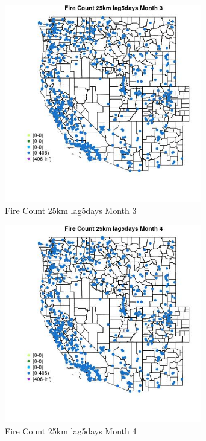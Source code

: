 \begin{figure} 
\centering  
\includegraphics[width=0.77\textwidth]{Code_Outputs/Report_ML_input_PM25_Step4_part_f_de_duplicated_aves_prioritize_24hr_obswNAs_MapObsMo3Fire_Count_25km_lag5days.jpg} 
\caption{\label{fig:Report_ML_input_PM25_Step4_part_f_de_duplicated_aves_prioritize_24hr_obswNAsMapObsMo3Fire_Count_25km_lag5days}Fire Count 25km lag5days Month 3} 
\end{figure} 
 

\begin{figure} 
\centering  
\includegraphics[width=0.77\textwidth]{Code_Outputs/Report_ML_input_PM25_Step4_part_f_de_duplicated_aves_prioritize_24hr_obswNAs_MapObsMo4Fire_Count_25km_lag5days.jpg} 
\caption{\label{fig:Report_ML_input_PM25_Step4_part_f_de_duplicated_aves_prioritize_24hr_obswNAsMapObsMo4Fire_Count_25km_lag5days}Fire Count 25km lag5days Month 4} 
\end{figure} 
 

